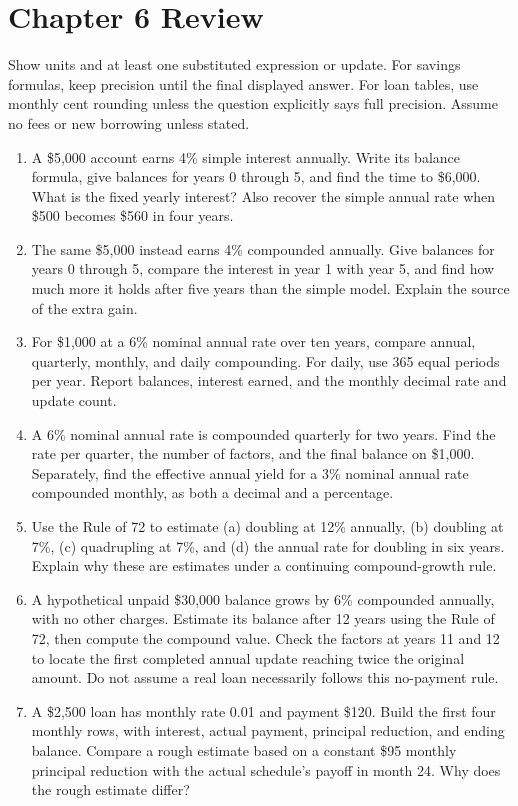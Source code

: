 \documentclass[11pt,letterpaper]{article}
\begin{document}
\section*{Chapter 6 Review}
Show units and at least one substituted expression or update. For savings formulas, keep precision until the final displayed answer. For loan tables, use monthly cent rounding unless the question explicitly says full precision. Assume no fees or new borrowing unless stated.
\begin{enumerate}
\item A \$5,000 account earns 4\% simple interest annually. Write its balance formula, give balances for years 0 through 5, and find the time to \$6,000. What is the fixed yearly interest? Also recover the simple annual rate when \$500 becomes \$560 in four years.
\item The same \$5,000 instead earns 4\% compounded annually. Give balances for years 0 through 5, compare the interest in year 1 with year 5, and find how much more it holds after five years than the simple model. Explain the source of the extra gain.
\item For \$1,000 at a 6\% nominal annual rate over ten years, compare annual, quarterly, monthly, and daily compounding. For daily, use 365 equal periods per year. Report balances, interest earned, and the monthly decimal rate and update count.
\item A 6\% nominal annual rate is compounded quarterly for two years. Find the rate per quarter, the number of factors, and the final balance on \$1,000. Separately, find the effective annual yield for a 3\% nominal annual rate compounded monthly, as both a decimal and a percentage.
\item Use the Rule of 72 to estimate (a) doubling at 12\% annually, (b) doubling at 7\%, (c) quadrupling at 7\%, and (d) the annual rate for doubling in six years. Explain why these are estimates under a continuing compound-growth rule.
\item A hypothetical unpaid \$30,000 balance grows by 6\% compounded annually, with no other charges. Estimate its balance after 12 years using the Rule of 72, then compute the compound value. Check the factors at years 11 and 12 to locate the first completed annual update reaching twice the original amount. Do not assume a real loan necessarily follows this no-payment rule.
\item A \$2,500 loan has monthly rate 0.01 and payment \$120. Build the first four monthly rows, with interest, actual payment, principal reduction, and ending balance. Compare a rough estimate based on a constant \$95 monthly principal reduction with the actual schedule's payoff in month 24. Why does the rough estimate differ?

\end{enumerate}
\end{document}
